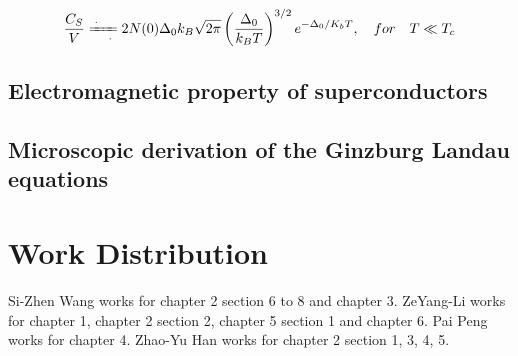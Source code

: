 ﻿\documentclass[twoside]{book}
\newcommand{\deq}{\xlongequal[\ \ \ \cdot]{\cdot\ \ \ }}
\numberwithin{equation}{section}
\begin{document}
\[\frac{C_S}{V}\deq 2N(0)\Delta_0 k_B\sqrt{2\pi}\left(\frac{\Delta_0}{k_B T}\right)^{3/2}e^{-\Delta_0/K_bT},\quad for\quad T\ll T_c \]


\section{Electromagnetic property of superconductors}
\section{Microscopic derivation of the Ginzburg Landau equations}

\newpage

\chapter*{Work Distribution}
Si-Zhen Wang works for chapter 2 section 6 to 8 and chapter 3. ZeYang-Li works for chapter 1, chapter 2 section 2, chapter 5 section 1 and chapter 6. Pai Peng works for chapter 4. Zhao-Yu Han works for chapter 2 section 1, 3, 4, 5. 
\end{document}
